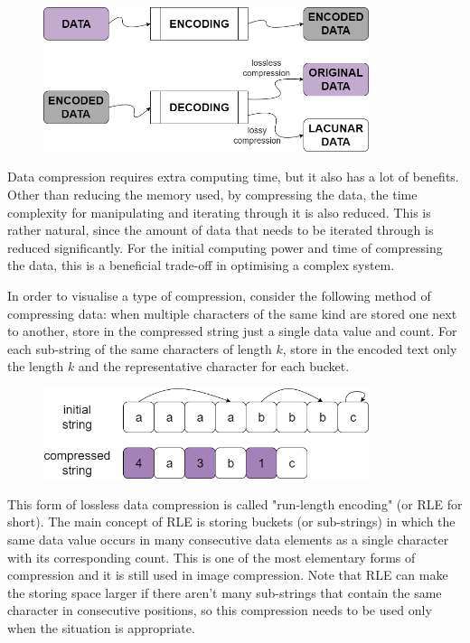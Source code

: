 \documentclass[letterpaper]{article}
\begin{document}
\begin{figure} [h!]
\centering
\includegraphics[width=0.85\textwidth]{pngOfDiagrams/compression1.png}
\end{figure}

Data compression requires extra computing time, but it also has a lot of benefits. Other than reducing the memory used, by compressing the data, the time complexity for manipulating and iterating through it is also reduced. This is rather natural, since the amount of data that needs to be iterated through is reduced significantly. For the initial computing power and time of compressing the data, this is a beneficial trade-off in optimising a complex system.

In order to visualise a type of compression, consider the following method of compressing data: when multiple characters of the same kind are stored one next to another, store in the compressed string just a single data value and count. For each sub-string of the same characters of length $k$, store in the encoded text only the length $k$ and the representative character for each bucket.

\newpage

\begin{figure} [h!]
\centering
\includegraphics[width=0.85\textwidth]{pngOfDiagrams/compression2.png}
\end{figure}

This form of lossless data compression is called "run-length encoding" (or RLE for short). The main concept of RLE is storing  buckets (or sub-strings) in which the same data value occurs in many consecutive data elements as a single character with its corresponding count. This is one of the most elementary forms of compression and it is still used in image compression. Note that RLE can make the storing space larger if there aren't many sub-strings that contain the same character in consecutive positions, so this compression needs to be used only when the situation is appropriate.
\end{document}
